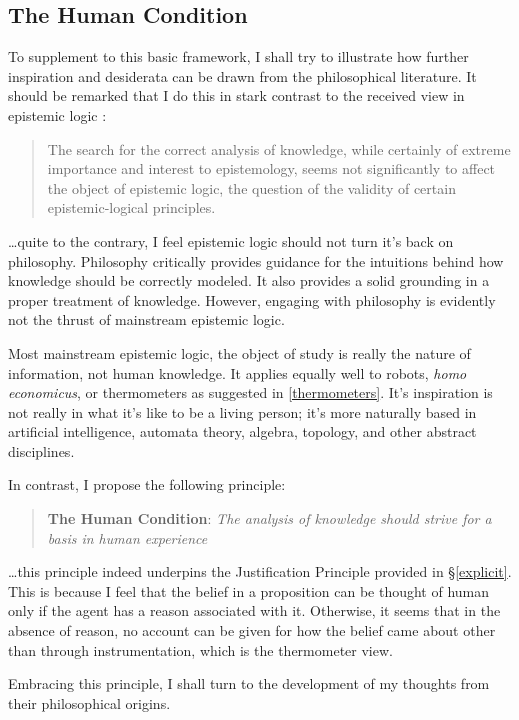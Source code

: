 \documentclass[11pt]{article}
\numberwithin{equation}{subsection}
\begin{document}
\subsection{The Human Condition}\label{Human-Condition}
To supplement to this basic framework, I shall try to illustrate how further inspiration and desiderata can be drawn from the philosophical literature.  It should be remarked that I do this in stark contrast to the received view in epistemic logic \citep[pg. 34]{lenzen_recent_1978}:
\begin{quote}
The search for the correct analysis of knowledge, while certainly of
extreme importance and interest to epistemology, seems not
significantly to affect the object of epistemic logic, the question of
the validity of certain epistemic-logical principles.
\end{quote}
\ldots quite to the contrary, I feel epistemic logic should not turn
it's back on philosophy. Philosophy critically provides guidance for
the intuitions behind how knowledge should be correctly modeled.  It
also provides a solid grounding in a proper treatment of knowledge.
However, engaging with philosophy is evidently not the thrust of
mainstream epistemic logic.

Most mainstream epistemic logic, the object of study is really the
nature of information, not human knowledge.  It applies equally well
to robots, \emph{homo economicus}, or thermometers as suggested in
\ref{thermometers}.  It's inspiration is not really in what it's like
to be a living person; it's more naturally based in artificial intelligence, automata
theory, algebra, topology, and other abstract disciplines.

In contrast, I propose the following principle:
\begin{quote}
 \textbf{The Human Condition}: \emph{The analysis of knowledge should strive for a basis in human experience}
\end{quote}
\ldots this principle indeed underpins the Justification Principle
provided in \S\ref{explicit}. This is because I feel that the belief
in a proposition can be thought of human only if the agent has a
reason associated with it.  Otherwise, it seems that in the absence of
reason, no account can be given for how the belief came about other
than through instrumentation, which is the thermometer view.

Embracing this principle, I shall turn to the development of my
thoughts from their philosophical origins.
\end{document}
